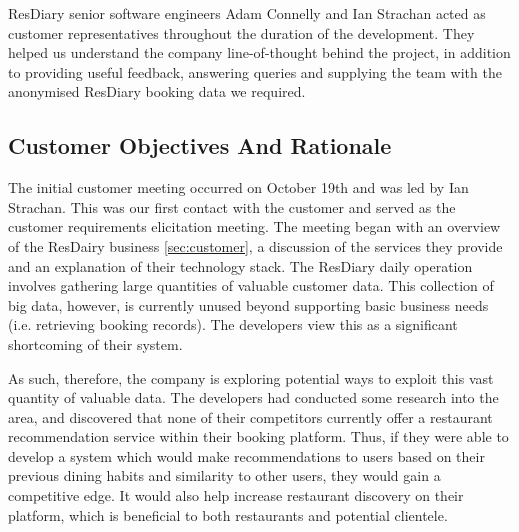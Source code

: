 \documentclass{l3proj}
\begin{document}
ResDiary senior software engineers Adam Connelly and Ian Strachan acted as customer representatives throughout the duration of the development. They helped us understand the company line-of-thought behind the project, in addition to providing useful feedback, answering queries and supplying the team with the anonymised ResDiary booking data we required.


\subsection{Customer Objectives And Rationale}
\label{sec:custobjectives}



The initial customer meeting occurred on October 19th and was led by Ian Strachan. This was our first contact with the customer and served as the customer requirements elicitation meeting. The meeting began with an overview of the ResDairy business \ref{sec:customer}, a discussion of the services they provide and an explanation of their technology stack. The ResDiary daily operation involves gathering large quantities of valuable customer data. This collection of big data, however, is currently unused beyond supporting basic business needs (i.e. retrieving booking records). The developers view this as a significant shortcoming of their system.

As such, therefore, the company is exploring potential ways to exploit this vast quantity of valuable data. The developers had conducted some research into the area, and discovered that none of their competitors currently offer a restaurant recommendation service within their booking platform. Thus, if they were able to develop a system which would make recommendations to users based on their previous dining habits and similarity to other users, they would gain a competitive edge. It would also help increase restaurant discovery on their platform, which is beneficial to both restaurants and potential clientele. 
\end{document}
